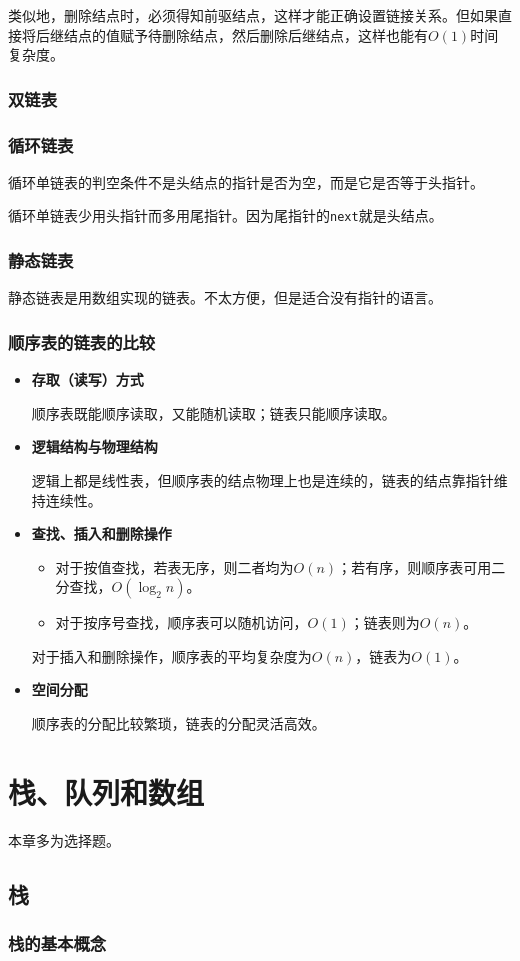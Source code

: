\documentclass[12pt, a4paper, oneside]{ctexart}
\begin{document}
类似地，删除结点时，必须得知前驱结点，这样才能正确设置链接关系。但如果直接将后继结点的值赋予待删除结点，然后删除后继结点，这样也能有$O(1)$时间复杂度。

\subsubsection{双链表}

\subsubsection{循环链表}

循环单链表的判空条件不是头结点的指针是否为空，而是它是否等于头指针。

循环单链表少用头指针而多用尾指针。因为尾指针的\verb|next|就是头结点。

\subsubsection{静态链表}

静态链表是用数组实现的链表。不太方便，但是适合没有指针的语言。

\subsubsection{顺序表的链表的比较}

\begin{itemize}
  \item {\bf 存取（读写）方式}
  
  顺序表既能顺序读取，又能随机读取；链表只能顺序读取。

  \item {\bf 逻辑结构与物理结构}
  
  逻辑上都是线性表，但顺序表的结点物理上也是连续的，链表的结点靠指针维持连续性。

  \item {\bf 查找、插入和删除操作}
  \begin{itemize}
    \item 对于按值查找，若表无序，则二者均为$O(n)$；若有序，则顺序表可用二分查找，$O(\log_2 n)$。
    \item 对于按序号查找，顺序表可以随机访问，$O(1)$；链表则为$O(n)$。
  \end{itemize}

  对于插入和删除操作，顺序表的平均复杂度为$O(n)$，链表为$O(1)$。

  \item {\bf 空间分配}
  
  顺序表的分配比较繁琐，链表的分配灵活高效。
\end{itemize}

\section{栈、队列和数组}

本章多为选择题。

\subsection{栈}

\subsubsection{栈的基本概念}
\end{document}
